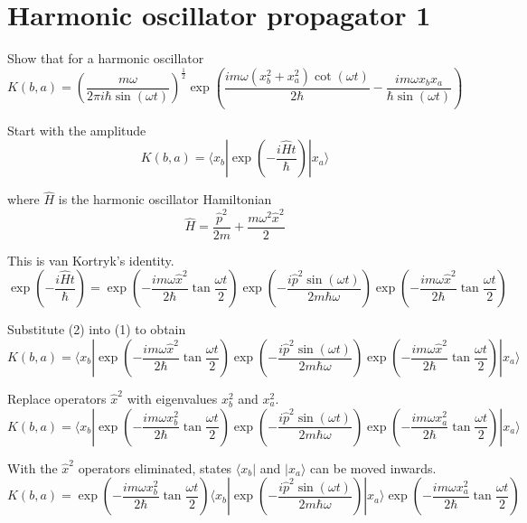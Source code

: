 

\section*{Harmonic oscillator propagator 1}

Show that for a harmonic oscillator
\begin{equation*}
K(b,a)=\left(\frac{m\omega}{2\pi i\hbar\sin(\omega t)}\right)^\frac{1}{2}
\exp\left(\frac{im\omega(x_b^2+x_a^2)\cot(\omega t)}{2\hbar}
-\frac{im\omega x_bx_a}{\hbar\sin(\omega t)}\right)
\end{equation*}

Start with the amplitude
\begin{equation*}
K(b,a)=\langle x_b|\exp\left(-\frac{i\hat Ht}{\hbar}\right)
|x_a\rangle
\tag{1}
\end{equation*}

where $\hat H$ is the harmonic oscillator Hamiltonian
\begin{equation*}
\hat H=\frac{\hat p^2}{2m}+\frac{m\omega^2\hat x^2}{2}
\end{equation*}

This is van Kortryk's identity.
\begin{equation*}
\exp\left(-\frac{i\hat Ht}{\hbar}\right)=
\exp\left(-\frac{im\omega\hat x^2}{2\hbar}\tan\frac{\omega t}{2}\right)
\exp\left(-\frac{i\hat p^2\sin(\omega t)}{2m\hbar\omega}\right)
\exp\left(-\frac{im\omega\hat x^2}{2\hbar}\tan\frac{\omega t}{2}\right)
\tag{2}
\end{equation*}

Substitute (2) into (1) to obtain
\begin{equation*}
K(b,a)=\langle x_b|\exp\left(-\frac{im\omega\hat x^2}{2\hbar}\tan\frac{\omega t}{2}\right)
\exp\left(-\frac{i\hat p^2\sin(\omega t)}{2m\hbar\omega}\right)
\exp\left(-\frac{im\omega\hat x^2}{2\hbar}\tan\frac{\omega t}{2}\right)
|x_a\rangle
\end{equation*}

Replace operators $\hat x^2$ with eigenvalues $x_b^2$ and $x_a^2$.
\begin{equation*}
K(b,a)=
\langle x_b|
\exp\left(-\frac{im\omega x_b^2}{2\hbar}\tan\frac{\omega t}{2}\right)
\exp\left(-\frac{i\hat p^2\sin(\omega t)}{2m\hbar\omega}\right)
\exp\left(-\frac{im\omega x_a^2}{2\hbar}\tan\frac{\omega t}{2}\right)
|x_a\rangle
\end{equation*}

With the $\hat x^2$ operators eliminated, states $\langle x_b|$ and $|x_a\rangle$ can be moved inwards.
\begin{equation*}
K(b,a)=
\exp\left(-\frac{im\omega x_b^2}{2\hbar}\tan\frac{\omega t}{2}\right)
\langle x_b|
\exp\left(-\frac{i\hat p^2\sin(\omega t)}{2m\hbar\omega}\right)
|x_a\rangle
\exp\left(-\frac{im\omega x_a^2}{2\hbar}\tan\frac{\omega t}{2}\right)
\end{equation*}


